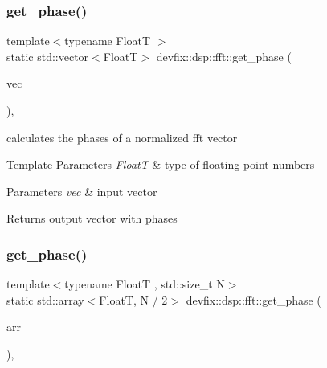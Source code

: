 \subsubsection{\texorpdfstring{get\+\_\+phase()}{get\_phase()}\hspace{0.1cm}{\footnotesize\ttfamily [2/3]}}
{\footnotesize\ttfamily template$<$typename FloatT $>$ \\
static std\+::vector$<$FloatT$>$ devfix\+::dsp\+::fft\+::get\+\_\+phase (\begin{DoxyParamCaption}\item[{const std\+::vector$<$ std\+::complex$<$ FloatT $>$$>$ \&}]{vec }\end{DoxyParamCaption})\hspace{0.3cm}{\ttfamily [inline]}, {\ttfamily [static]}}



calculates the phases of a normalized fft vector 


\begin{DoxyTemplParams}{Template Parameters}
{\em FloatT} & type of floating point numbers \\
\hline
\end{DoxyTemplParams}

\begin{DoxyParams}{Parameters}
{\em vec} & input vector \\
\hline
\end{DoxyParams}
\begin{DoxyReturn}{Returns}
output vector with phases 
\end{DoxyReturn}
\mbox{\label{structdevfix_1_1dsp_1_1fft_abee685e0c6688e55a353ca019ea2793c}} 
\subsubsection{\texorpdfstring{get\+\_\+phase()}{get\_phase()}\hspace{0.1cm}{\footnotesize\ttfamily [3/3]}}
{\footnotesize\ttfamily template$<$typename FloatT , std\+::size\+\_\+t N$>$ \\
static std\+::array$<$FloatT, N / 2$>$ devfix\+::dsp\+::fft\+::get\+\_\+phase (\begin{DoxyParamCaption}\item[{const std\+::array$<$ std\+::complex$<$ FloatT $>$, N $>$ \&}]{arr }\end{DoxyParamCaption})\hspace{0.3cm}{\ttfamily [inline]}, {\ttfamily [static]}}



